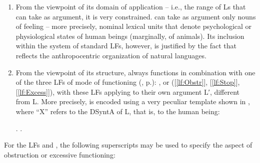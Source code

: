 \begin{enumerate}

\item From the viewpoint of its domain of application -- i.e., the range of Ls that  can take as argument, it is very constrained.  can take as argument only nouns of feeling -- more precisely, nominal lexical units that denote psychological or physiological states of human beings (marginally, of animals). Its inclusion within the system of standard LFs, however, is justified by the fact that  reflects the anthropocentric organization of natural languages.

\item From the viewpoint of its structure,  always functions in combination with one of the three LFs of mode of functioning (, p.\thinspace\pageref{sec:FLmodeFonct}): \mbox{},  or  ([\ref{lf:Obstr}], [\ref{lf:Stop}], [\ref{lf:Excess}]), with these LFs applying to their own argument L′, different from L. More precisely,  is encoded using a very peculiar template shown in \Next, where ``X'' refers to the DSyntA\thinspace{} of L, that is, to the human being:

\begingroup
\small

\ex.\label{ex:SymptTemplate} .

\endgroup

\end{enumerate}

For the LFs  and , the following superscripts may be used to specify the aspect of obstruction or excessive functioning:

